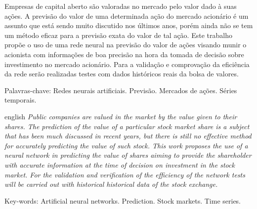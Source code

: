 
\begin{resumo}
\noindent
Empresas de capital aberto são valoradas no mercado pelo valor dado à suas ações. A previsão do valor de uma determinada ação do mercado acionário é um assunto que está sendo muito discutido nos últimos anos, porém ainda não se tem um método eficaz para a previsão exata do valor de tal ação. Este trabalho propõe o uso de uma rede neural na previsão do valor de ações visando munir o acionista com informações de boa precisão na hora da tomada de decisão sobre investimento no mercado acionário. Para a validação e comprovação da eficiência da rede serão realizadas testes com dados históricos reais da bolsa de valores. 


 \vspace{0.2cm}
    
 
 Palavras-chave: Redes neurais artificiais. Previsão. Mercados de ações. Séries temporais.
\end{resumo}

\begin{resumo}[Abstract]	
 	\begin{otherlanguage*}{english}
 	\noindent 
	\textit{
	Public companies are valued in the market by the value given to their shares. The prediction of the value of a particular stock market share is a subject that has been much discussed in recent years, but there is still no effective method for accurately predicting the value of such stock. This work proposes the use of a neural network in predicting the value of shares aiming to provide the shareholder with accurate information at the time of decision on investment in the stock market. For the validation and verification of the efficiency of the network tests will be carried out with historical historical data of the stock exchange.
	} 
   \vspace{0.2cm}
 
   
    Key-words: Artificial neural networks. Prediction. Stock markets. Time series.
 	\end{otherlanguage*}
\end{resumo}
